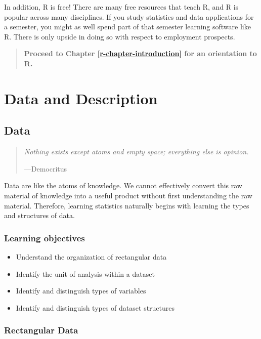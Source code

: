 \documentclass[
]{book}
\providecommand{\tightlist}{%
  \setlength{\itemsep}{0pt}\setlength{\parskip}{0pt}}
\begin{document}
In addition, R is free! There are many free resources that teach R, and R is popular across many disciplines. If you study statistics and data applications for a semester, you might as well spend part of that semester learning software like R. There is only upside in doing so with respect to employment prospects.

\begin{quote}
\textbf{Proceed to Chapter \ref{r-chapter-introduction} for an orientation to R.}
\end{quote}

\hypertarget{part-data-and-description}{%
\part{Data and Description}\label{part-data-and-description}}

\hypertarget{data}{%
\chapter{Data}\label{data}}

\begin{quote}
\emph{Nothing exists except atoms and empty space; everything else is opinion.}

---Democritus
\end{quote}

Data are like the atoms of knowledge. We cannot effectively convert this raw material of knowledge into a useful product without first understanding the raw material. Therefore, learning statistics naturally begins with learning the types and structures of data.

\hypertarget{lo2}{%
\section{Learning objectives}\label{lo2}}

\begin{itemize}
\tightlist
\item
  Understand the organization of rectangular data
\item
  Identify the unit of analysis within a dataset
\item
  Identify and distinguish types of variables
\item
  Identify and distinguish types of dataset structures
\end{itemize}

\hypertarget{rectangular-data}{%
\section{Rectangular Data}\label{rectangular-data}}
\end{document}
